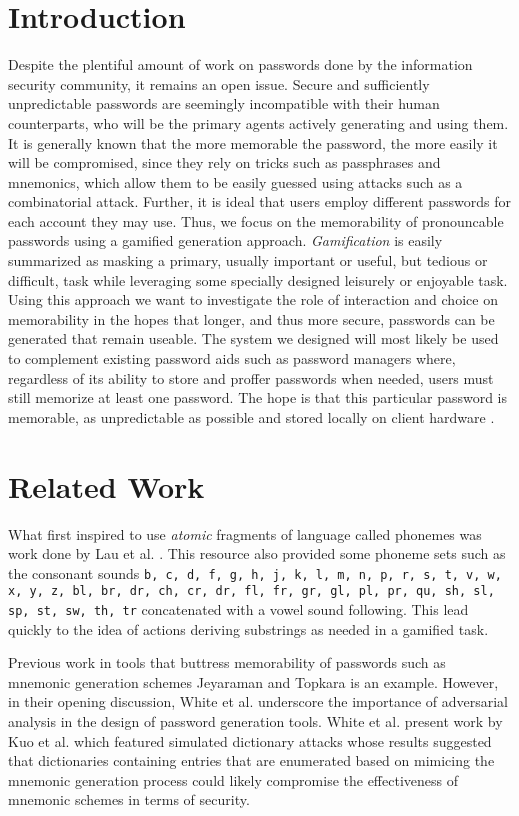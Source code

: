 \documentclass[conference]{IEEEtran}
\begin{document}
\section{Introduction}
Despite the plentiful amount of work on passwords done by the information security community, it remains an open issue. Secure and sufficiently unpredictable passwords are seemingly incompatible with their human counterparts, who will be the primary agents actively generating and using them. It is generally known that the more memorable the password, the more easily it will be compromised, since they rely on tricks such as passphrases and mnemonics, which allow them to be easily guessed using attacks such as a combinatorial attack. Further, it is ideal that users employ different passwords for each account they may use. Thus, we focus on the memorability of pronouncable passwords using a gamified generation approach. \emph{Gamification} is easily summarized as masking a primary, usually important or useful, but tedious or difficult, task while leveraging some specially designed leisurely or enjoyable task. Using this approach we want to investigate the role of interaction and choice on memorability in the hopes that longer, and thus more secure, passwords can be generated that remain useable. The system we designed will most likely be used to complement existing password aids such as password managers where, regardless of its ability to store and proffer passwords when needed, users must still memorize at least one password. The hope is that this particular password is memorable, as unpredictable as possible and stored locally on client hardware 
.

\section{Related Work}
What first inspired to use \emph{atomic} fragments of language called phonemes was work done by Lau et al. \cite{report:phonemes}. This resource also provided some phoneme sets such as the consonant sounds {\tt b, c, d, f, g, h, j, k, l, m, n, p, r, s, t, v, w, x, y, z, bl, br, dr, ch, cr, dr, fl, fr, gr, gl, pl, pr, qu, sh, sl, sp, st, sw, th, tr} concatenated with a vowel sound following. This lead quickly to the idea of actions deriving substrings as needed in a gamified task. 

Previous work in tools that buttress memorability of passwords such as mnemonic generation schemes Jeyaraman and Topkara \cite{report:mnemonic} is an example. However, in their opening discussion, White et al. \cite{report:prounounceability} underscore the importance of adversarial analysis in the design of password generation tools. White et al. present work by Kuo et al. \cite{report:mnemonicanalysis} which featured simulated dictionary attacks whose results suggested that dictionaries containing entries that are enumerated based on mimicing the mnemonic generation process could likely compromise the effectiveness of mnemonic schemes in terms of security. 
\end{document}
